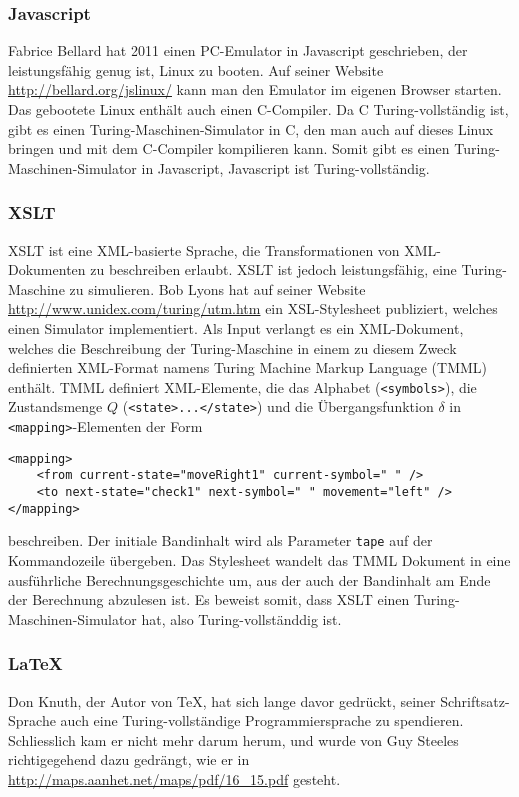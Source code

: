 \subsubsection{Javascript}
%
Fabrice Bellard hat 2011 einen PC-Emulator in Javascript geschrieben, der
leistungsfähig genug ist, Linux zu booten. Auf seiner Website
\url{http://bellard.org/jslinux/} kann man den Emulator im eigenen Browser
starten. Das gebootete Linux enthält auch einen C-Compiler. Da C
Turing-vollständig ist, gibt es einen Turing-Maschinen-Simulator in
C, den man auch auf dieses Linux bringen und mit dem C-Compiler
kompilieren kann. Somit gibt es einen Turing-Maschinen-Simulator in
Javascript, Javascript ist Turing-vollständig.

\subsubsection{XSLT}
%
XSLT ist eine XML-basierte Sprache, die Transformationen von XML-Dokumenten
zu beschreiben erlaubt. XSLT ist jedoch leistungsfähig, eine Turing-Maschine
zu simulieren. Bob Lyons hat auf seiner Website
\url{http://www.unidex.com/turing/utm.htm} ein XSL-Stylesheet publiziert,
welches einen Simulator implementiert. Als Input verlangt es
ein
XML-Dokument, welches die Beschreibung der Turing-Maschine in einem
zu diesem Zweck definierten XML-Format namens Turing Machine Markup
Language (TMML) enthält. TMML definiert XML-Elemente, die das Alphabet
(\verb+<symbols>+),
die Zustandsmenge $Q$ (\verb+<state>...</state>+)
und die Übergangsfunktion $\delta$ in \verb+<mapping>+-Elementen
der Form
\begin{verbatim}
<mapping>
    <from current-state="moveRight1" current-symbol=" " />
    <to next-state="check1" next-symbol=" " movement="left" />
</mapping>
\end{verbatim}
beschreiben. Der initiale Bandinhalt wird als Parameter \verb+tape+
auf der Kommandozeile übergeben.
Das Stylesheet wandelt das TMML Dokument in eine ausführliche
Berechnungsgeschichte um, aus der auch der Bandinhalt am Ende der Berechnung
abzulesen ist. Es beweist somit, dass XSLT einen Turing-Maschinen-Simulator
hat, also Turing-vollständdig ist.

\subsubsection{\LaTeX}
%
%
Don Knuth, der Autor von \TeX, hat sich lange davor gedrückt, seiner
Schriftsatz-Sprache auch eine Turing-vollständige Programmiersprache
zu spendieren. Schliesslich kam er nicht mehr darum herum, und wurde
von Guy Steeles richtigegehend dazu gedrängt, wie er in
\url{http://maps.aanhet.net/maps/pdf/16\_15.pdf}
gesteht.

